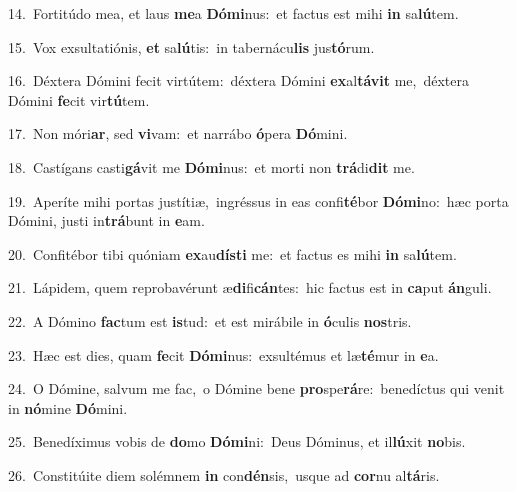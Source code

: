 {\numbfont\textcolor{\numbcolor}{14.}}~Fortitúdo mea, et laus \textbf{me}\-a \textbf{Dó}\-\textbf{mi}nus:~\star et factus est mihi \textbf{in} sa\-\textbf{lú}\-tem.\par
{\numbfont\textcolor{\numbcolor}{15.}}~Vox exsultatiónis, \textbf{et} sa\-\textbf{lú}\-tis:~\star in tabernácu\textbf{lis} jus\-\textbf{tó}\-rum.\par
{\numbfont\textcolor{\numbcolor}{16.}}~Déxtera Dómini fecit virtútem:~\dagger déxtera Dómini \textbf{ex}\-al\-\textbf{tá}\-\textbf{vit} me,~\star déxtera Dómini \textbf{fe}\-cit vir\-\textbf{tú}\-tem.\par
{\numbfont\textcolor{\numbcolor}{17.}}~Non móri\-\textbf{ar}\-, sed \textbf{vi}\-vam:~\star et narrábo \textbf{ó}\-pera \textbf{Dó}\-mini.\par
{\numbfont\textcolor{\numbcolor}{18.}}~Castígans casti\-\textbf{gá}\-vit me \textbf{Dó}\-\textbf{mi}nus:~\star et morti non \textbf{trá}\-di\textbf{dit} me.\par
{\numbfont\textcolor{\numbcolor}{19.}}~Aperíte mihi portas justítiæ,~\dagger ingréssus in eas confi\-\textbf{té}\-bor \textbf{Dó}\-\textbf{mi}no:~\star hæc porta Dómini, justi in\-\textbf{trá}\-bunt in \textbf{e}\-am.\par
{\numbfont\textcolor{\numbcolor}{20.}}~Confitébor tibi quóniam \textbf{ex}\-au\-\textbf{dís}\-\textbf{ti} me:~\star et factus es mihi \textbf{in} sa\-\textbf{lú}\-tem.\par
{\numbfont\textcolor{\numbcolor}{21.}}~Lápidem, quem reprobavérunt æ\-\textbf{di}\-fi\-\textbf{cán}\-tes:~\star hic factus est in \textbf{ca}\-put \textbf{án}\-guli.\par
{\numbfont\textcolor{\numbcolor}{22.}}~A Dómino \textbf{fac}\-tum est \textbf{is}\-tud:~\star et est mirábile in \textbf{ó}\-culis \textbf{nos}\-tris.\par
{\numbfont\textcolor{\numbcolor}{23.}}~Hæc est dies, quam \textbf{fe}\-cit \textbf{Dó}\-\textbf{mi}nus:~\star exsultémus et læ\-\textbf{té}\-mur in \textbf{e}\-a.\par
{\numbfont\textcolor{\numbcolor}{24.}}~O Dómine, salvum me fac,~\dagger o Dómine bene \textbf{pro}\-spe\-\textbf{rá}\-re:~\star benedíctus qui venit in \textbf{nó}\-mine \textbf{Dó}\-mini.\par
{\numbfont\textcolor{\numbcolor}{25.}}~Benedíximus vobis de \textbf{do}\-mo \textbf{Dó}\-\textbf{mi}ni:~\star Deus Dóminus, et il\-\textbf{lú}\-xit \textbf{no}\-bis.\par
{\numbfont\textcolor{\numbcolor}{26.}}~Constitúite diem solémnem \textbf{in} con\-\textbf{dén}\-sis,~\star usque ad \textbf{cor}\-nu al\-\textbf{tá}\-ris.\par
